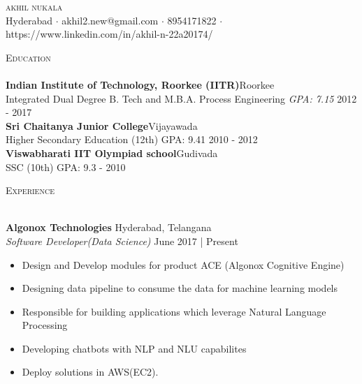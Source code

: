 \documentclass[a4paper]{article}
\newcommand{\lineunder} {
    \vspace*{-8pt} \\
    \hspace*{-18pt} \hrulefill \\
}
\newcommand{\header} [1] {
    {\hspace*{-18pt}\vspace*{6pt} \textsc{#1}}
    \vspace*{-6pt} \lineunder
}
\begin{document}
\vspace*{-40pt}

\vspace*{-10pt}
\begin{center}
	{\Huge \scshape {akhil nukala}}\\
	Hyderabad $\cdot$ akhil2.new@gmail.com $\cdot$ 8954171822 $\cdot$ https://www.linkedin.com/in/akhil-n-22a20174/\\
\end{center}

\header{Education}
\textbf{Indian Institute of Technology, Roorkee (IITR)}\hfill Roorkee\\
Integrated Dual Degree B. Tech and M.B.A. Process Engineering \textit{GPA: 7.15} \hfill 2012 - 2017\\
\vspace{2mm}
\textbf{Sri Chaitanya Junior College}\hfill Vijayawada\\
Higher Secondary Education (12th) GPA: 9.41 \hfill 2010 - 2012\\
\vspace{2mm}
\textbf{Viswabharati IIT Olympiad school}\hfill Gudivada\\
SSC (10th) GPA: 9.3 \hfill  - 2010\\
\vspace{2mm}

\header{Experience}
\vspace{1mm}

\textbf{Algonox Technologies} \hfill Hyderabad, Telangana\\
\textit{Software Developer(Data Science)} \hfill June 2017 | Present\\
\vspace{-1mm}
\begin{itemize} \itemsep 1pt
	\item Design and Develop modules for product ACE (Algonox Cognitive Engine)
	\item Designing data pipeline to consume the data for machine learning models
	\item Responsible for building applications which leverage Natural Language Processing
    \item Developing chatbots with NLP and NLU capabilites
    \item Deploy solutions in AWS(EC2).
\end{itemize}
\end{document}
